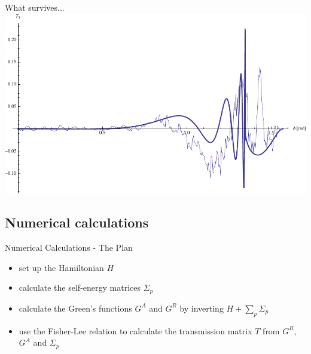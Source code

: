 \documentclass{beamer}
\begin{document}
\begin{frame}{What survives...}
    \includegraphics[width=\textwidth]{comparison-over-phi.pdf}
\end{frame}

\subsection{Numerical calculations}
\begin{frame}{Numerical Calculations - The Plan}
    \begin{center}
    \begin{itemize}
        \item set up the Hamiltonian $H$
        \item calculate the self-energy matrices $\Sigma_p$
        \item calculate the Green's functions $G^A$ and $G^R$ by inverting
            $H + \sum_p \Sigma_p$
        \item use the Fisher-Lee relation to calculate the transmission matrix $T$
                from $G^R$, $G^A$ and $\Sigma_p$
    \end{itemize}
    \end{center}
\end{frame}
\end{document}
